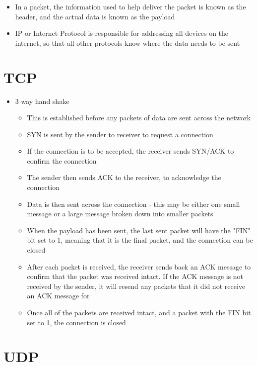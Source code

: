 
\begin{itemize}
  \item In a packet, the information used to help deliver the packet is known as the header, and the actual data is known as the payload
  \item IP or Internet Protocol is responsible for addressing all devices on the internet, so that all other protocols know where the data needs to be sent
\end{itemize}

\section*{TCP}

\begin{itemize}
  \item 3 way hand shake
  \begin{itemize}
    \item This is established before any packets of data are sent across the network
    \item SYN is sent by the sender to receiver to request a connection
    \item If the connection is to be accepted, the receiver sends SYN/ACK to confirm the connection
    \item The sender then sends ACK to the receiver, to acknowledge the connection
    \item Data is then sent across the connection - this may be either one small message or a large message broken down into smaller packets
    \item When the payload has been sent, the last sent packet will have the "FIN" bit set to 1, meaning that it is the final packet, and the connection can be closed
    \item After each packet is received, the receiver sends back an ACK message to confirm that the packet was received intact. If the ACK message is not received by the sender, it will resend any packets that it did not receive an ACK message for
    \item Once all of the packets are received intact, and a packet with the FIN bit set to 1, the connection is closed
  \end{itemize}
\end{itemize}

\section*{UDP}

